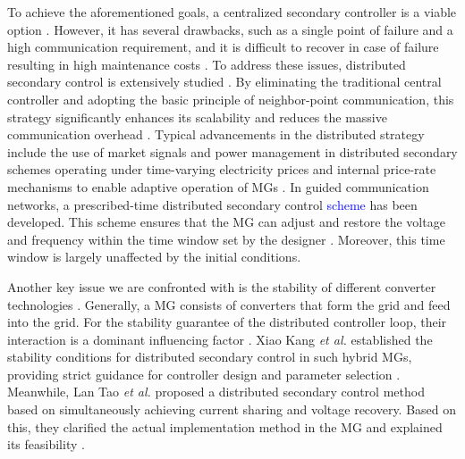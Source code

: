 \documentclass[]{interact}
\theoremstyle{plain}%
\theoremstyle{definition}
\theoremstyle{remark}
\begin{document}

To achieve the aforementioned goals, a centralized secondary controller is a viable option \citep{Muhammad2023}. However, it has several drawbacks, such as a single point of failure and a high communication requirement, and it is difficult to recover in case of failure resulting in high maintenance costs \citep{Nada2023,Gabriel2023}. 
To address these issues, distributed secondary control is extensively studied \citep{Kinga2024,Yu2024,Rongrong2024}. By eliminating the traditional central controller and adopting the basic principle of neighbor-point communication, this strategy significantly enhances its scalability and reduces the massive communication overhead \citep{Louassaa2025,Abdurraqeeb2024}. Typical advancements in the distributed strategy include the use of market signals and power management in distributed secondary schemes operating under time-varying electricity prices and internal price-rate mechanisms to enable adaptive operation of MGs \citep{Rueda2024}. In guided communication networks, a prescribed-time distributed secondary control \textcolor{blue}{scheme} has been developed. This scheme ensures that the MG can adjust and restore the voltage and frequency within the time window set by the designer \citep{Chang2024,Hou2025}. Moreover, this time window is largely unaffected by the initial conditions.

Another key issue we are confronted with is the stability of different converter technologies \citep{Marin2025,Lakshmi2025}. Generally, a MG consists of converters that form the grid and feed into the grid. For the stability guarantee of the distributed controller loop, their interaction is a dominant influencing factor \citep{Ali2024,Ahmadi2023}. Xiao Kang \emph{et al.} established the stability conditions for distributed secondary control in such hybrid MGs, providing strict guidance for controller design and parameter selection \citep{Xiaokang2023}. Meanwhile, Lan Tao \emph{et al.} proposed a distributed secondary control method based on simultaneously achieving current sharing and voltage recovery. Based on this, they clarified the actual implementation method in the MG and explained its feasibility \citep{Lantao2019,Li2025}.
\end{document}

